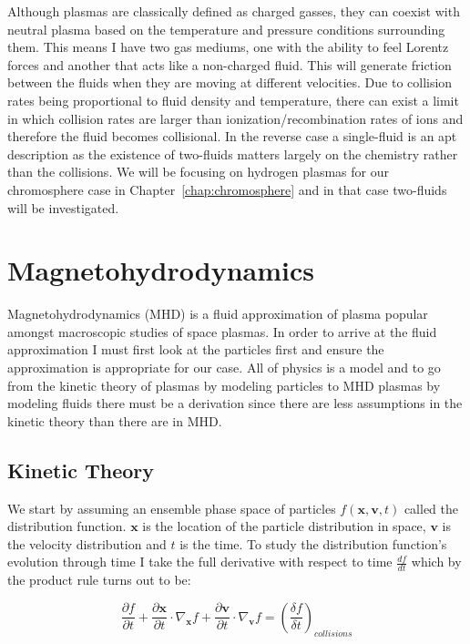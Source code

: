 \documentclass[12pt,upcase]{umlthesis}
\begin{document}
Although plasmas are classically defined as charged gasses, they can coexist with neutral plasma based on the temperature and pressure conditions surrounding them. This means I have two gas mediums, one with the ability to feel Lorentz forces and another that acts like a non-charged fluid. This will generate friction between the fluids when they are moving at different velocities. Due to collision rates being proportional to fluid density and temperature, there can exist a limit in which collision rates are larger than ionization/recombination rates of ions and therefore the fluid becomes collisional. In the reverse case a single-fluid is an apt description as the existence of two-fluids matters largely on the chemistry rather than the collisions. We will be focusing on hydrogen plasmas for our chromosphere case in Chapter~\ref{chap:chromosphere} and in that case two-fluids will be investigated.

\section{Magnetohydrodynamics}\label{sec:mhd}

Magnetohydrodynamics (MHD) is a fluid approximation of plasma popular amongst macroscopic studies of space plasmas. In order to arrive at the fluid approximation I must first look at the particles first and ensure the approximation is appropriate for our case. All of physics is a model and to go from the kinetic theory of plasmas by modeling particles to MHD plasmas by modeling fluids there must be a derivation since there are less assumptions in the kinetic theory than there are in MHD\@.

\subsection{Kinetic Theory}\label{sec:kinetictheory}

We start by assuming an ensemble phase space of particles $f(\textbf{x}, \textbf{v}, t)$ called the distribution function. $\textbf{x}$ is the location of the particle distribution in space, $\textbf{v}$ is the velocity distribution and $t$ is the time. To study the distribution function's evolution through time I take the full derivative with respect to time $\frac{df}{dt}$ which by the product rule turns out to be:

\begin{equation}
	\frac{\partial f}{\partial t} + \frac{\partial \textbf{x}}{\partial t} \cdot \nabla_{\textbf{x}} f + \frac{\partial \textbf{v}}{\partial t} \cdot \nabla_{\textbf{v}} f = {(\frac{\delta f}{\delta t})}_{collisions}
\end{equation}
\end{document}
